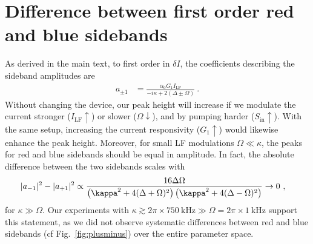 \section{Difference between first order red and blue sidebands}\label{sec:bluered}
% 
As derived in the main text, to first order in $\delta I$, the coefficients describing the sideband amplitudes are
% 
\begin{align}
a_{\pm 1} & = \frac{\alpha_0 G_1 I_\text{LF}}{-i\kappa+2(\Delta\pm\Omega)} \ .
\label{eq:input-output-first}
\end{align}
% 
Without changing the device, our peak height will increase if we modulate the current stronger ($I_\text{LF}\uparrow$) or slower ($\Omega\downarrow$), and by pumping harder ($S_\text{in}\uparrow$).
% 
With the same setup, increasing the current responsivity ($G_1\uparrow$) would likewise enhance the peak height.
% 
Moreover, for small LF modulations $\Omega\ll\kappa$, the peaks for red and blue sidebands should be equal in amplitude.
% 
In fact, the absolute difference between the two sidebands scales with
% 
\begin{align}
\abs{a_{-1}}^2-\abs{a_{+1}}^2 &\propto \frac{16 \Delta \Omega}{\left( \kappa^2+4(\Delta+\Omega)^2 \right)\left( \kappa^2+4(\Delta-\Omega)^2 \right)} \rightarrow 0 \ ,
\end{align}
for $\kappa \gg \Omega$.
% 
Our experiments with $\kappa \gtrsim 2\pi\times\SI{750}{\kilo\hertz} \gg \Omega = 2\pi\times\SI{1}{\kilo\hertz}$ support this statement, as we did not observe systematic differences between red and blue sidebands (cf Fig.~\ref{fig:plusminus}) over the entire parameter space.

